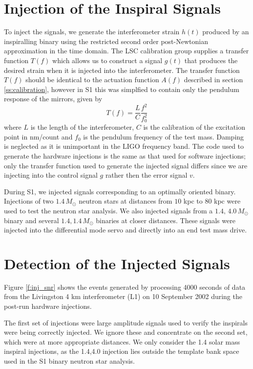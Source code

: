 \section{Injection of the Inspiral Signals}
\label{s:injecting}

To inject the signals, we generate the interferometer strain $h(t)$ produced
by an inspiralling binary using the restricted second order post-Newtonian
approximation in the time domain\cite{Blanchet:1996pi}.  The LSC calibration group
supplies a transfer function $T(f)$ which allows us to construct a signal
$g(t)$ that produces the desired strain when it is injected into the
interferometer.  The transfer function $T(f)$ should be identical to the
actuation function $A(f)$ described in section \ref{ss:calibration}, however
in S1 this was simplfied to contain only the pendulum response of the mirrors,
given by 
\begin{equation}
T(f) = \frac{L}{C}\frac{f^2}{f_0^2}
\end{equation}
where $L$ is the length of the interferometer, $C$ is the calibration of the
excitation point in nm/count and $f_0$ is the pendulum frequency of the test
mass. Damping is neglected as it is unimportant in the LIGO frequency band.
The code used to generate the hardware injections is the same as that used
for software injections; only the transfer function used to generate the
injected signal differs since we are injecting into the control signal $g$
rather then the error signal $v$.

During S1, we injected signals corresponding to an optimally oriented binary.
Injections of two $1.4\,M_\odot$ neutron stars at distances from $10$ kpc to
$80$ kpc were used to test the neutron star analysis. 
We also injected signals from a $1.4,\,4.0\,M_\odot$ binary and several
$1.4,1.4\,M_\odot$ binaries at closer distances.  These signals were injected
into the differential mode servo and directly into an end test mass drive.

\section{Detection of the Injected Signals}
\label{s:detection}

Figure \ref{f:inj_snr} shows the events generated by processing 4000 seconds
of data from the Livingston 4 km interferometer (L1) on 10 September 2002
during the post-run hardware injections.

The first set of injections were large amplitude signals used to verify the
inspirals were being correctly injected. We ignore these and concentrate on
the second set, which were at more appropriate distances.  We only consider
the 1.4 solar mass inspiral injections, as the 1.4,4.0 injection lies
outside the template bank space used in the S1 binary neutron star analysis.

